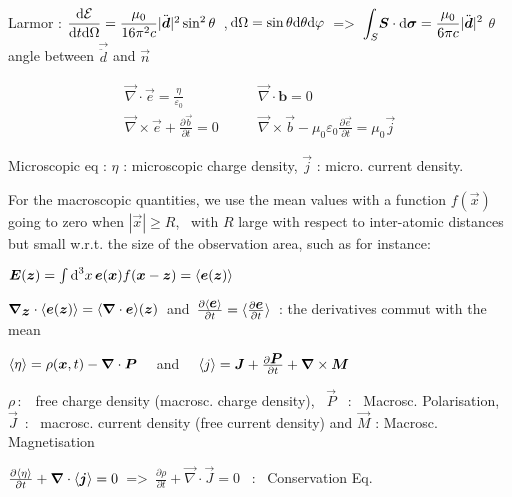 \item Larmor : $\dfrac{\textrm{d} \mathcal{E}}{\textrm{d} t\textrm{d} \Omega} = \dfrac{\mu_0}{16\pi^2c}|\ddot{\mbox{\boldmath$d$}}|^2\sin^2\theta$ \,,$\,\textrm{d} \Omega = \sin\theta\textrm{d} \theta\textrm{d} \varphi \, $ => $\, \displaystyle{\int_{S}} \mbox{\boldmath$S$}\cdot\mbox{\boldmath$\textrm{d} \sigma$} = \dfrac{\mu_0}{6\pi c} |\ddot{\mbox{\boldmath$d$}}|^2$  $\theta$ angle between $ \vec{\ddot{d}}$ and $ \vec{n}$
\squishend

\squishlist
\item[] $$\boxed{\begin{split}
	\vec{\nabla}\cdot\vec{e} = \frac{\eta}{\varepsilon_0}  \qquad &\vec{\nabla} \cdot \boldsymbol{b} = 0\\
	\vec{\nabla}\times \vec{e} + \frac{\partial\vec{b}}{\partial t} =0 \qquad & \vec{\nabla} \times \vec{b} - \mu_0 \varepsilon_0 \frac{\partial \vec{e}}{\partial t} = \mu_0 \vec{j}
	\end{split}}$$
\item[] Microscopic eq : $\eta$ : microscopic charge density, $\vec{j}$ : micro. current density.

\item[] For the macroscopic quantities, we use the mean values with a function $f(\vec{x})$ going to zero when $|\vec{x}| \geq R$, \, with $R$ large with respect to inter-atomic distances but small w.r.t. the size of the observation area, such as for instance:

\item $\mbox{\boldmath$E$}(\mbox{\boldmath$z$}) = \int \textrm{d} ^3x \, \mbox{\boldmath$e$}(\mbox{\boldmath$x$})f(\mbox{\boldmath$x$}-\mbox{\boldmath$z$}) =  \langle\mbox{\boldmath$e$}(\mbox{\boldmath$z$})\rangle$

\item $\mbox{\boldmath$\nabla$}_{\mbox{\boldmath$z$}} \cdot \langle\mbox{\boldmath$e$}(\mbox{\boldmath$z$})\rangle = \langle\mbox{\boldmath$\nabla$} \cdot \mbox{\boldmath$e$}\rangle(\mbox{\boldmath$z$}) \, $ and  $\, \frac{\partial \langle\mbox{\boldmath$e$}\rangle}{\partial t} = \langle\frac{\partial \mbox{\boldmath$e$}}{\partial t}\rangle \,$ : the derivatives commut with the mean

\item $\langle\eta\rangle = \rho(\mbox{\boldmath$x$},t) - \mbox{\boldmath$\nabla$}\cdot\mbox{\boldmath$P$} \quad$ and  $\quad \langle j\rangle = \mbox{\boldmath$J$} + \frac{\partial \mbox{\boldmath$P$}}{\partial t} + \mbox{\boldmath$\nabla$} \times \mbox{\boldmath$M$}$

\item $\rho \, :$ \, free charge density (macrosc. charge density), \, $\vec{P}$ \, : \, Macrosc. Polarisation, \, $\vec{J} \,$ : \, macrosc. current density (free current density) and $\vec{M}$ : Macrosc. Magnetisation

\item $\frac{\partial \langle\eta\rangle}{\partial t} + \mbox{\boldmath$\nabla$}\cdot\langle\mbox{\boldmath$j$}\rangle = 0 \,$ => $\, \frac{\partial \rho}{\partial t} + \vec{\nabla}\cdot\vec{J} = 0$ \, : \, Conservation Eq.
\squishend
{}
\squishlist

